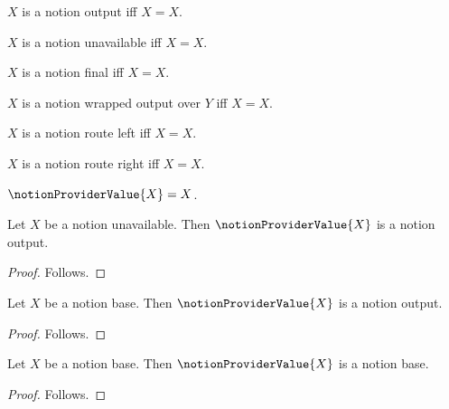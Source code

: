 

\begin{definition}\label{notion_provider_output}
    $X$ is a notion output iff $X=X$.
\end{definition}

\begin{definition}\label{notion_provider_unavailable}
    $X$ is a notion unavailable iff $X=X$.
\end{definition}

\begin{definition}\label{notion_provider_final}
    $X$ is a notion final iff $X=X$.
\end{definition}

\begin{definition}\label{notion_provider_wrapped_output}
    $X$ is a notion wrapped output over $Y$ iff $X=X$.
\end{definition}

\begin{definition}\label{notion_provider_route_left}
    $X$ is a notion route left iff $X=X$.
\end{definition}

\begin{definition}\label{notion_provider_route_right}
    $X$ is a notion route right iff $X=X$.
\end{definition}

\begin{definition}\label{notion_provider_value}
    $\notionProviderValue{X}=X$.
\end{definition}

\begin{classification}\label{notion_provider_value_unavailable_result}
    Let $X$ be a notion unavailable.
    Then $\notionProviderValue{X}$ is a notion output.
\end{classification}
\begin{proof}
    Follows.
\end{proof}

\begin{classification}\label{notion_provider_value_result}
    Let $X$ be a notion base.
    Then $\notionProviderValue{X}$ is a notion output.
\end{classification}
\begin{proof}
    Follows.
\end{proof}

\begin{classification}\label{notion_provider_value_base_result}
    Let $X$ be a notion base.
    Then $\notionProviderValue{X}$ is a notion base.
\end{classification}
\begin{proof}
    Follows.
\end{proof}

